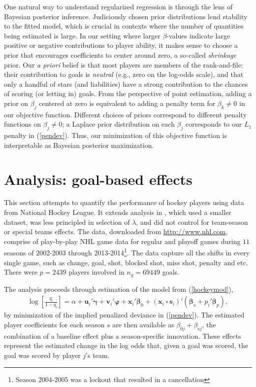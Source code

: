One natural way to understand regularized regression is through the lens of
Bayesian posterior inference. Judiciously chosen prior distributions lend
stability to the fitted model, which is crucial in contexts where the number
of quantities being estimated is large. In our setting where larger
$\beta$-values indicate large positive or negative contributions to player
ability, it makes sense to choose a prior that encourages coefficients to
center around zero, a so-called {\em shrinkage} prior.  Our {\em a priori}
belief is that most players are members of the rank-and-file: their
contribution to goals is {\em neutral} (e.g., zero on the log-odds scale), and
that only a handful of stars (and liabilities) have a strong contribution to
the chances of scoring (or letting in) goals.  From the perspective of point
estimation, adding a prior on $\beta_j$ centered at zero is equivalent to
adding a penalty term for $\beta_k \ne 0$ in our objective function. Different
choices of priors correspond to different penalty functions on $\beta_j \ne
0$; a Laplace prior distribution on each $\beta_j$  corresponds to our $L_1$
penalty in (\ref{pendev}).  Thus, our minimization of this objective function
is interpretable as Bayesian posterior maximization.

\section{Analysis: goal-based effects}
\label{sec:goals}



This section attempts to quantify the performance of hockey players using data
from National Hockey League. It extends  analysis in
\cite{gramacy:jensen:taddy:2013}, which used a smaller dataset, was less
principled in selection of $\lambda$, and did not control for team-season or
special teams effects. The data, downloaded from \url{http://www.nhl.com},
comprise of play-by-play NHL game data for regular and playoff games during
$11$ seasons of 2002-2003 through 2013-2014\footnote{Season 2004-2005 was a
lockout that resulted in a cancellation}. The data capture all the shifts in
every single game, such as change, goal, shot, blocked shot, miss shot,
penalty and etc. There were $p=2439$ players involved in $n_g=69449$ goals.


The analysis proceeds through estimation of the model from (\ref{hockeymod}),
\begin{align*}
\log\left[\frac{q_{i}}{1-q_{i}}\right] = \alpha + \mathbf{u}_i'\boldsymbol{\gamma} +
\mathbf{v}_i'\boldsymbol{\varphi} + \mathbf{x}_i'\boldsymbol{\beta}_0 +
(\mathbf{x}_i\circ\mathbf{s}_i)'(\boldsymbol{\beta}_s +
p_i'\boldsymbol{\beta}_{p}), \end{align*} by minimization of the implied
penalized deviance in (\ref{pendev}). The estimated player coefficients for
each season $s$ are then available as $\beta_{0j} + \beta_{sj}$,  the
combination of a  baseline effect plus a season-specific innovation.  These
effects represent the estimated change in the log odds that, given a goal was
scored, the goal was scored by player $j$'s team.


